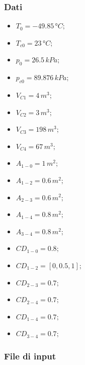 \documentclass{article}
\begin{document}
        \subsubsection{Dati}
        \begin{itemize}
            \item $\displaystyle T_0 = -49.85\,°C;$ \
            \item $\displaystyle T_{c0} = 23\,°C;$ \
            \item $\displaystyle p_0 = 26.5\,kPa;$ \
            \item $\displaystyle p_{c0} = 89.876\,kPa;$ \
            \item $\displaystyle V_{C1} = 4\,m^3;$ \
            \item $\displaystyle V_{C2} = 3\,m^3;$ \
            \item $\displaystyle V_{C3} = 198\,m^3;$ \
            \item $\displaystyle V_{C4} = 67\,m^3;$ \
            \item $\displaystyle A_{1-0} = 1\,m^2;$ \
            \item $\displaystyle A_{1-2} = 0.6\,m^2;$ \
            \item $\displaystyle A_{2-3} = 0.6\,m^2;$ \
            \item $\displaystyle A_{1-4} = 0.8\,m^2;$ \
            \item $\displaystyle A_{3-4} = 0.8\,m^2;$ \
            \item $\displaystyle CD_{1-0} = 0.8;$ \
            \item $\displaystyle CD_{1-2} = [0, 0.5, 1];$ \
            \item $\displaystyle CD_{2-3} = 0.7;$ \
            \item $\displaystyle CD_{2-4} = 0.7;$ \
            \item $\displaystyle CD_{1-4} = 0.7;$ \
            \item $\displaystyle CD_{3-4} = 0.7;$ \
        \end{itemize}
        \clearpage
        \subsubsection{File di input}
\end{document}
